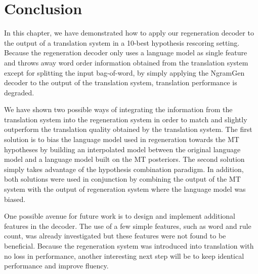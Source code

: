 \section{Conclusion}

In this chapter, we have demonstrated how to apply our regeneration
decoder to the output of a translation system in a 10-best hypothesis
rescoring setting. Because the regeneration decoder only uses
a language model as single feature and throws away word order
information obtained from the translation system except for splitting
the input bag-of-word, by simply
applying the NgramGen decoder to the output of the translation system, translation
performance is degraded.

We have shown two possible ways of integrating the information from the
translation system into the regeneration system in order to match
and slightly outperform the translation quality obtained by the
translation system. The first solution is to bias the language
model used in regeneration towards the MT hypotheses by building an interpolated
model between the original language model and a language model built on the MT
posteriors. The second
solution simply takes advantage of the hypothesis combination paradigm.
In addition, both solutions were used in conjunction by combining the output
of the MT system with the output of regeneration system where the language model
was biased.

One possible avenue for future work is to design and implement additional
features in the decoder. The use of a few simple features, such as word and rule count, was
already investigated but these features were not found to be beneficial.
Because the regeneration system was introduced into translation with no loss
in performance, another interesting next step will be to keep identical performance
and improve fluency.

